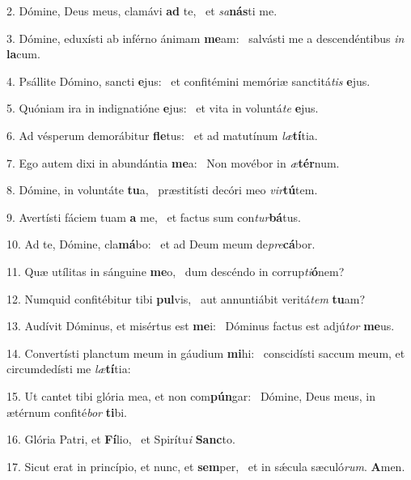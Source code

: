 2. Dómine, Deus meus, clamávi \textbf{ad} te, \ast\  et \textit{sa}\textbf{nás}ti me.\

3. Dómine, eduxísti ab inférno ánimam \textbf{me}am: \ast\  salvásti me a descendéntibus \textit{in} \textbf{la}cum.\

4. Psállite Dómino, sancti \textbf{e}jus: \ast\  et confitémini memóriæ sanctitá\textit{tis} \textbf{e}jus.\

5. Quóniam ira in indignatióne \textbf{e}jus: \ast\  et vita in voluntá\textit{te} \textbf{e}jus.\

6. Ad vésperum demorábitur \textbf{fle}tus: \ast\  et ad matutínum \textit{læ}\textbf{tí}tia.\

7. Ego autem dixi in abundántia \textbf{me}a: \ast\  Non movébor in \textit{æ}\textbf{tér}num.\

8. Dómine, in voluntáte \textbf{tu}a, \ast\  præstitísti decóri meo \textit{vir}\textbf{tú}tem.\

9. Avertísti fáciem tuam \textbf{a} me, \ast\  et factus sum con\textit{tur}\textbf{bá}tus.\

10. Ad te, Dómine, cla\textbf{má}bo: \ast\  et ad Deum meum de\textit{pre}\textbf{cá}bor.\

11. Quæ utílitas in sánguine \textbf{me}o, \ast\  dum descéndo in corrup\textit{ti}\textbf{ó}nem?\

12. Numquid confitébitur tibi \textbf{pul}vis, \ast\  aut annuntiábit veritá\textit{tem} \textbf{tu}am?\

13. Audívit Dóminus, et misértus est \textbf{me}i: \ast\  Dóminus factus est adjú\textit{tor} \textbf{me}us.\

14. Convertísti planctum meum in gáudium \textbf{mi}hi: \ast\  conscidísti saccum meum, et circumdedísti me \textit{læ}\textbf{tí}tia:\

15. Ut cantet tibi glória mea, et non com\textbf{pún}gar: \ast\  Dómine, Deus meus, in ætérnum confité\textit{bor} \textbf{ti}bi.\

16. Glória Patri, et \textbf{Fí}lio, \ast\  et Spirítu\textit{i} \textbf{Sanc}to.\

17. Sicut erat in princípio, et nunc, et \textbf{sem}per, \ast\  et in sǽcula sæculó\textit{rum}. \textbf{A}men.\

